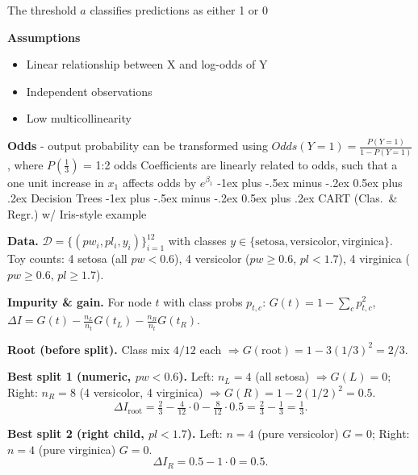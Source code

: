 \documentclass[10pt,landscape]{article}
\makeatletter
\renewcommand{\section}{\@startsection{section}{1}{0mm}%
                                {-1ex plus -.5ex minus -.2ex}%
                                {0.5ex plus .2ex}%
                                {\normalfont\large\bfseries}}
\makeatother
\begin{document}
\begin{multicols}{3}
\begin{center}
    \end{center}
    \vspace{-2mm}
    The threshold $a$ classifies predictions as either 1 or 0

    \textbf{Assumptions}
    \begin{itemize}[label={--},leftmargin=4mm]
        \vspace{-1mm}
        \itemsep -.4mm
        \item Linear relationship between X and log-odds of Y
        \item Independent observations
        \item Low multicollinearity
    \end{itemize}
    \textbf{Odds} - output probability can be transformed using $Odds(Y = 1) = \frac{P(Y=1)}{1-P(Y=1)}$, where $P(\frac{1}{3})$ = 1:2 odds
    Coefficients are linearly related to odds, such that a one unit increase in $x_1$ affects odds by $e^{\beta_1}$
    \vspace{-.5mm}
    \section{Decision Trees}
    \section{CART (Clas.\ \& Regr.) w/ Iris-style example}

    \textbf{Data.} $\mathcal{D}=\{(pw_i,pl_i,y_i)\}_{i=1}^{12}$ with classes $y\in\{\text{setosa},\text{versicolor},\text{virginica}\}$.
    Toy counts: 4 setosa (all $pw<0.6$), 4 versicolor ($pw\ge0.6$, $pl<1.7$), 4 virginica ($pw\ge0.6$, $pl\ge1.7$).

    \textbf{Impurity \& gain.} For node $t$ with class probs $p_{t,c}$:
    $G(t)=1-\sum_c p_{t,c}^2$,\;
    $\Delta I=G(t)-\frac{n_L}{n_t}G(t_L)-\frac{n_R}{n_t}G(t_R)$.

    \textbf{Root (before split).} Class mix $4/12$ each $\Rightarrow G(\text{root})=1-3(1/3)^2=2/3$.

    \textbf{Best split 1 (numeric, $pw<0.6$).}
    Left: $n_L=4$ (all setosa) $\Rightarrow G(L)=0$;\;
    Right: $n_R=8$ (4 versicolor, 4 virginica) $\Rightarrow G(R)=1-2(1/2)^2=0.5$.
    \[
        \Delta I_{\text{root}}=\tfrac{2}{3}-\tfrac{4}{12}\cdot0-\tfrac{8}{12}\cdot0.5
        =\tfrac{2}{3}-\tfrac{1}{3}=\boxed{\tfrac{1}{3}}.
    \]

    \textbf{Best split 2 (right child, $pl<1.7$).}
    Left: $n=4$ (pure versicolor) $G=0$;\; Right: $n=4$ (pure virginica) $G=0$.
    \[
        \Delta I_{R}=0.5-1\cdot0=\boxed{0.5}.
    \]


\end{multicols}
\end{document}
